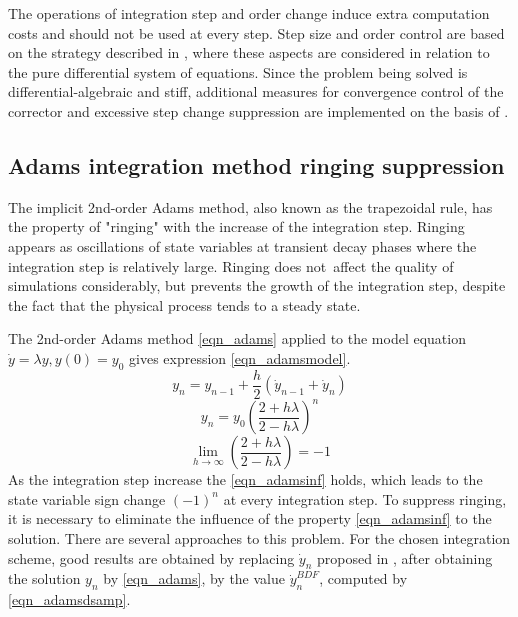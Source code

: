 \documentclass[lettersize,journal]{IEEEtran}
\begin{document}
The operations of integration step and order change induce extra computation costs and should not be used at every step. Step size and order control are based on the strategy described in \cite{Radhakrishnan1993}, where these aspects are considered in relation to the pure differential system of equations. Since the problem being solved is differential-algebraic and stiff, additional measures for convergence control of the corrector and excessive step change suppression are implemented on the basis of \cite{petzold82}.

\subsection{Adams integration method ringing suppression}

The implicit 2nd-order Adams method, also known as the trapezoidal rule, has the property of "ringing" with the increase of the integration step. Ringing appears as oscillations of state variables at transient decay phases where the integration step is relatively large. Ringing does not affect the quality of simulations considerably, but prevents the growth of the integration step, despite the fact that the physical process tends to a steady state.

The 2nd-order Adams method \eqref{eqn_adams} applied to the model equation \(\dot{y}=\lambda y, y(0)=y_0\) gives expression \eqref{eqn_adamsmodel}.
\begin{equation}
	\label{eqn_adams}
	y_n=y_{n-1}+\frac{h}{2}\left(\dot{y}_{n-1}+\dot{y}_n\right)
\end{equation}
\begin{equation}
	\label{eqn_adamsmodel}
	y_n=y_0 \left( \frac{2+h\lambda }{2-h\lambda } \right)^n
\end{equation}
\begin{equation}
	\label{eqn_adamsinf}
	\lim_{h\rightarrow\infty}{ \left( \frac{2+h \lambda }{2-h \lambda } \right) } = -1
\end{equation}
As the integration step increase the \eqref{eqn_adamsinf} holds, which leads to the state variable sign change \((-1)^n\) at every integration step. To suppress ringing, it is necessary to eliminate the influence of the property \eqref{eqn_adamsinf} to the solution. There are several approaches to this problem. For the chosen integration scheme, good results are obtained by replacing \(\dot{y}_n\) proposed in \cite{Lee2015}, after obtaining the solution \(y_n\) by \eqref{eqn_adams}, by the value \(\dot{y}_n^{BDF}\), computed by \eqref{eqn_adamsdsamp}.
\end{document}
